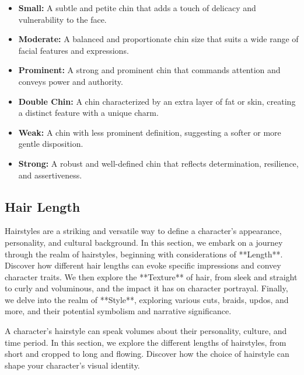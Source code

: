 \documentclass[12pt]{book}
\begin{document}
\begin{itemize}
    \item \textbf{Small:} A subtle and petite chin that adds a touch of delicacy and vulnerability to the face.
    \item \textbf{Moderate:} A balanced and proportionate chin size that suits a wide range of facial features and expressions.
    \item \textbf{Prominent:} A strong and prominent chin that commands attention and conveys power and authority.
    \item \textbf{Double Chin:} A chin characterized by an extra layer of fat or skin, creating a distinct feature with a unique charm.
    \item \textbf{Weak:} A chin with less prominent definition, suggesting a softer or more gentle disposition.
    \item \textbf{Strong:} A robust and well-defined chin that reflects determination, resilience, and assertiveness.
\end{itemize}

\subsection{\textbf{Hair Length}}

Hairstyles are a striking and versatile way to define a character's appearance, personality, and cultural background. In this section, we embark on a journey through the realm of hairstyles, beginning with considerations of **Length**. Discover how different hair lengths can evoke specific impressions and convey character traits. We then explore the **Texture** of hair, from sleek and straight to curly and voluminous, and the impact it has on character portrayal. Finally, we delve into the realm of **Style**, exploring various cuts, braids, updos, and more, and their potential symbolism and narrative significance.

A character's hairstyle can speak volumes about their personality, culture, and time period. In this section, we explore the different lengths of hairstyles, from short and cropped to long and flowing. Discover how the choice of hairstyle can shape your character's visual identity.
\end{document}
